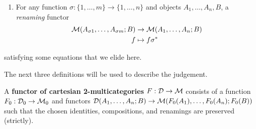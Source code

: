\begin{definition}
\begin{enumerate}
  \item For any function $\sigma : \{1,\dots,m\} \to \{1,\dots,n\}$ and
    objects $A_1,\dots,A_n,B$, a \emph{renaming} functor
    \begin{align*}
      \mathcal{M}(A_{\sigma 1},\dots,A_{\sigma m}; B) &\to \mathcal{M}(A_1,\dots,A_n;B)\\
      f &\mapsto f\sigma^*
    \end{align*}
  \end{enumerate}
satisfying some equations that we elide here.  
\end{definition}

The next three definitions will be used to describe the
 judgement.  

\begin{definition}
  A \textbf{functor of cartesian 2-multicategories} $F:\mathcal{D}\to\mathcal{M}$ consists
  of a function $F_0 : \mathcal{D}_0 \to \mathcal{M}_0$ and functors $\mathcal{D}(A_1,\ldots,A_n;B)
  \to \mathcal{M}(F_0(A_1),\ldots,F_0(A_n);F_0(B))$ such that the chosen
  identities, compositions, and renamings are preserved (strictly).
\end{definition}

